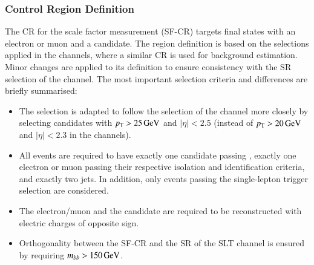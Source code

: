 \subsubsection{Control Region Definition}

The CR for the scale factor measurement (SF-CR) targets final states with an
electron or muon and a \tauhadvis candidate. The region definition is based on
the selections applied in the \lephad channels, where a similar CR is used for
\faketauhadvis background estimation. Minor changes are applied to its
definition to ensure consistency with the SR selection of the \hadhad
channel. The most important selection criteria and differences are briefly
summarised:
\begin{itemize}

\item The \tauhadvis selection is adapted to follow the selection of the \hadhad
  channel more closely by selecting candidates with $p_{\text{T}} > \SI{25}{\ensuremath{\text{GeV}}}$ and
  $|\eta| < \num{2.5}$ (instead of $\pT > \SI{20}{\GeV}$ and
  $|\eta| < \num{2.3}$ in the \lephad channels).

\item All events are required to have exactly one \tauhadvis candidate passing
  \tauid, exactly one electron or muon passing their respective isolation and
  identification criteria, and exactly two \btagged jets. In addition, only
  events passing the single-lepton trigger selection are considered.

\item The electron/muon and the \tauhadvis candidate are required to be
  reconstructed with electric charges of opposite sign.

\item Orthogonality between the SF-CR and the SR of the \lephad SLT channel is
  ensured by requiring $m_{bb} > \SI{150}{\ensuremath{\text{GeV}}}$.

\end{itemize}


